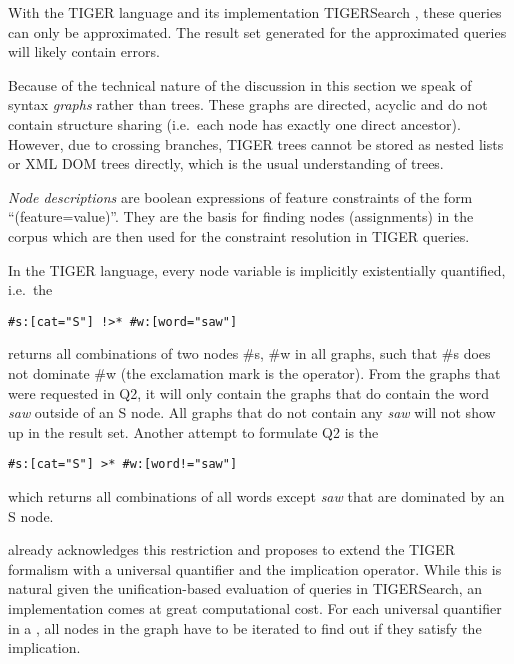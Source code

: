 \documentclass[output=paper]{LSP/langsci}
\begin{document}
With the TIGER  language and its implementation TIGERSearch \citep{Lezius2002a}, these queries can only be approximated. The result set generated for the approximated queries will likely contain errors. 

Because of the technical nature of the discussion in this section we speak of syntax \textit{graphs} rather than trees. These graphs are directed, acyclic and do not contain structure sharing (i.e.~each node has exactly one direct ancestor). However, due to crossing branches, TIGER trees cannot be stored as nested lists or XML DOM trees directly, which is the usual understanding of trees. 

\textit{Node descriptions} are boolean expressions of feature constraints of the form ``(feature=value)''. They are the basis for finding nodes (assignments) in the corpus which are then used for the constraint resolution in TIGER queries. 

In the TIGER  language, every node variable is implicitly existentially quantified, i.e.~the  

\ea
\begin{lstlisting}
#s:[cat="S"] !>* #w:[word="saw"] 
\end{lstlisting}
\z

\noindent returns all combinations of two nodes \#s, \#w in all graphs, such that \#s does not dominate \#w (the exclamation mark is the  operator). From the graphs that were requested in Q2, it will only contain the graphs that do contain the word \textit{saw} outside of an S node. All graphs that do not contain any \textit{saw} will not show up in the result set. Another attempt to formulate Q2 is the  

\ea
\begin{lstlisting}
#s:[cat="S"] >* #w:[word!="saw"] 
\end{lstlisting}
\z
 
\noindent which returns all combinations of all words except \textit{saw} that are dominated by an S node. 
 
\citet{Lezius2002b} already acknowledges this restriction and proposes to extend the TIGER  formalism with a universal quantifier and the implication operator. While this is natural given the unification-based evaluation of queries in TIGERSearch, an implementation comes at great computational cost. For each universal quantifier in a , all nodes in the graph have to be iterated to find out if they satisfy the implication. 
\end{document}

